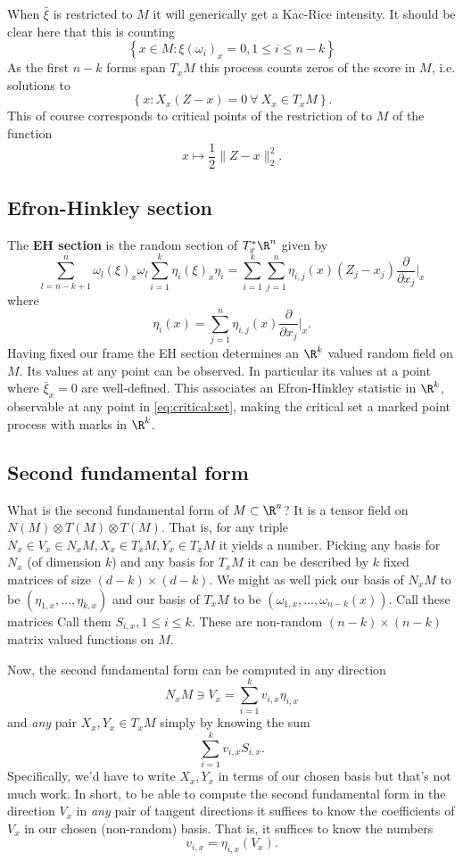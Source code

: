 \documentclass{article}
\begin{document}
When $\bar{\xi}$ is restricted to $M$ it will generically get a Kac-Rice intensity. It should be
clear here that this is counting
$$
\left\{x \in M: \xi(\omega_i)_x=0, 1 \leq i \leq n-k\right\}
$$
As the first $n-k$ forms span $T_xM$  this process counts zeros of the score in $M$, i.e.
solutions to
\begin{equation}
\label{eq:critical:set}
\left\{x: X_x(Z-x)=0 \ \forall \  X_x \in T_xM\right\}.
\end{equation}
This of course corresponds to critical points of the restriction of  to $M$ of the function
$$
x \mapsto \frac{1}{2}\|Z-x\|^2_2.
$$

\subsection{Efron-Hinkley section}

The {\bf EH section} is the random section of $T_x^*\R^n$ given by
$$
\sum_{l=n-k+1}^n \omega_l(\xi)_x \omega_l
\sum_{i=1}^k \eta_i(\xi)_x \eta_i = \sum_{i=1}^k \sum_{j=1}^n \eta_{i,j}(x)(Z_j - x_j) \frac{\partial}{\partial x_j} \biggl|_x
$$
where
$$
\eta_i(x) = \sum_{j=1}^n \eta_{i,j}(x) \frac{\partial}{\partial x_j} \biggl|_x.
$$
Having fixed our frame the EH section determines an $\R^k$ valued random field on $M$. Its values at any point can be observed. In particular its values at a point where $\bar{\xi}_x=0$
are well-defined. This associates an Efron-Hinkley statistic in $\R^k$, observable at any point in \eqref{eq:critical:set}, making the critical set a marked point process with marks in
$\R^k$.

\subsection{Second fundamental form}

What is the second fundamental form of $M \subset \R^n$? It is a
tensor field on $N(M) \otimes T(M) \otimes T(M)$. That is, for any
triple $N_x \in V_x \in N_xM, X_x \in T_xM, Y_x \in T_xM$ it yields a
number. Picking any basis for $N_x$ (of dimension $k$) and any
basis for $T_xM$ it can be
described by $k$ fixed matrices of size $(d-k) \times (d-k)$. We might
as well pick our basis of $N_xM$ to be $(\eta_{1,x}, \dots, \eta_{k,x})$
and our basis of $T_xM$ to be $(\omega_{1,x}, \dots, \omega_{n-k}(x))$.
Call these matrices
Call them $S_{i,x}, 1 \leq i \leq k$. These are non-random $(n-k) \times (n-k)$ matrix valued functions on
$M$.

Now, the second fundamental form can be computed in any direction
$$
N_xM \ni V_x = \sum_{i=1}^k v_{i,x} \eta_{i,x}
$$ and {\em any} pair $X_x,Y_x \in T_xM$ simply by knowing the sum
$$
\sum_{i=1}^k v_{i,x} S_{i,x}.
$$
Specifically, we'd have to write $X_x, Y_x$ in terms of our chosen basis but that's not much work. In short, to be able to compute the second fundamental form in the direction $V_x$ in {\em any} pair of tangent
directions it suffices to know the coefficients of $V_x$ in our chosen (non-random) basis. That is, it suffices to know the numbers
$$
v_{i,x} = \eta_{i,x}(V_x).
$$
\end{document}

